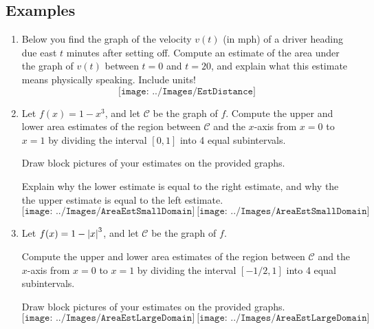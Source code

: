 \documentclass[11pt]{article}
\theoremstyle{definition}
\theoremstyle{named}
\numberwithin{myalgctr}{section}
\begin{document}


\subsection*{Examples}
\begin{enumerate}
  \item Below you find the graph of the velocity $v(t)$ (in mph) of a driver heading due east $t$ minutes after setting off. Compute an estimate of the area under the graph of $v(t)$ between $t=0$ and $t=20$, and explain what this estimate means physically speaking. Include units!
  \[
  \texttt{[image: ../Images/EstDistance]}
  \]
  \item Let $f(x)=1-x^3$, and let $\mathcal{C}$ be the graph of $f$.
  Compute the upper and lower area estimates of the region between $\mathcal{C}$ and the $x$-axis from $x=0$ to $x=1$ by dividing the interval $[0,1]$ into 4 equal subintervals.

  Draw block pictures of your estimates on the provided graphs.

  Explain why the lower estimate is equal to the right estimate, and why the the upper estimate is equal to the left estimate.
  \[
  \texttt{[image: ../Images/AreaEstSmallDomain]}\  \texttt{[image: ../Images/AreaEstSmallDomain]}
  \]

\item Let $f(x)=1-\left\lvert x\right\rvert_{}^3$, and let $\mathcal{C}$ be the graph of $f$.

Compute the upper and lower area estimates of the region between $\mathcal{C}$ and the $x$-axis from $x=0$ to $x=1$ by dividing the interval $[-1/2,1]$ into 4 equal subintervals.

Draw block pictures of your estimates on the provided graphs.
\[
\texttt{[image: ../Images/AreaEstLargeDomain]}\  \texttt{[image: ../Images/AreaEstLargeDomain]}
\]
\end{enumerate}
\end{document}
